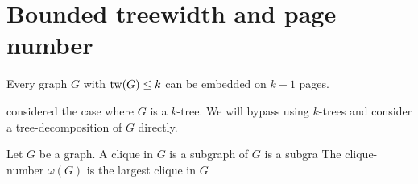 
\section{Bounded treewidth and page number}\label{sec:Bounded_Treewidth}
\begin{theorem}\label{thm:bded_treewidth_bded_pagenumber}
	Every graph \(G\) with \(\operatorname{tw}(G) \leq k\) can be embedded on $k + 1$ pages.
\end{theorem}
\textcite{ganleyPagenumberTrees2001} considered the case where \(G\) is a \(k\)-tree. We will bypass using \(k\)-trees and consider a tree-decomposition of \(G\) directly.

Let $G$ be a graph. A clique in $G$ is a subgraph of $G$ is a subgra The clique-number $\omega(G)$ is the largest clique in $G$


